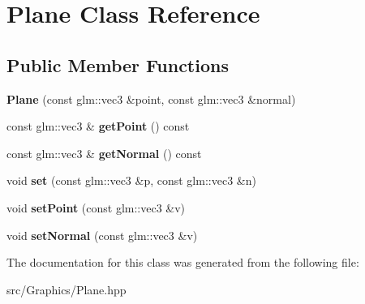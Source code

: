 \hypertarget{class_plane}{\section{Plane Class Reference}
\label{class_plane}
}
\subsection*{Public Member Functions}
\begin{DoxyCompactItemize}
\item 
\hypertarget{class_plane_a0a14e8d32c676562658c02780ca1918d}{{\bfseries Plane} (const glm\+::vec3 \&point, const glm\+::vec3 \&normal)}\label{class_plane_a0a14e8d32c676562658c02780ca1918d}

\item 
\hypertarget{class_plane_ac8618916c4a6ff465dc96113f36195f8}{const glm\+::vec3 \& {\bfseries get\+Point} () const }\label{class_plane_ac8618916c4a6ff465dc96113f36195f8}

\item 
\hypertarget{class_plane_a8263d290db5d00897496a950a7f5158e}{const glm\+::vec3 \& {\bfseries get\+Normal} () const }\label{class_plane_a8263d290db5d00897496a950a7f5158e}

\item 
\hypertarget{class_plane_a4f064b9ccdcb6f8e090f8296b07038b9}{void {\bfseries set} (const glm\+::vec3 \&p, const glm\+::vec3 \&n)}\label{class_plane_a4f064b9ccdcb6f8e090f8296b07038b9}

\item 
\hypertarget{class_plane_ae181915ab3cd4a3f650f762dba027dab}{void {\bfseries set\+Point} (const glm\+::vec3 \&v)}\label{class_plane_ae181915ab3cd4a3f650f762dba027dab}

\item 
\hypertarget{class_plane_a015ab062f55788a6a8d1be7b7695f7f7}{void {\bfseries set\+Normal} (const glm\+::vec3 \&v)}\label{class_plane_a015ab062f55788a6a8d1be7b7695f7f7}

\end{DoxyCompactItemize}


The documentation for this class was generated from the following file\+:\begin{DoxyCompactItemize}
\item 
src/\+Graphics/Plane.\+hpp\end{DoxyCompactItemize}
